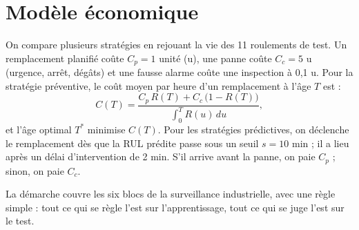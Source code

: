 \section{Modèle économique}

On compare plusieurs stratégies en rejouant la vie des 11 roulements de test. Un remplacement planifié coûte $C_p = 1$ unité (u), une panne coûte $C_c = 5$ u (urgence, arrêt, dégâts) et une fausse alarme coûte une inspection à 0,1 u. Pour la stratégie préventive, le coût moyen par heure d'un remplacement à l'âge $T$ est \cite{barlow1965} :
\begin{equation}
C(T) = \frac{C_p\,R(T) + C_c\,\big(1 - R(T)\big)}{\int_0^T R(u)\,du},
\end{equation}
et l'âge optimal $T^*$ minimise $C(T)$. Pour les stratégies prédictives, on déclenche le remplacement dès que la RUL prédite passe sous un seuil $s = 10$ min ; il a lieu après un délai d'intervention de 2 min. S'il arrive avant la panne, on paie $C_p$ ; sinon, on paie $C_c$.

\chapconclusion
La démarche couvre les six blocs de la surveillance industrielle, avec une règle simple : tout ce qui se règle l'est sur l'apprentissage, tout ce qui se juge l'est sur le test.
